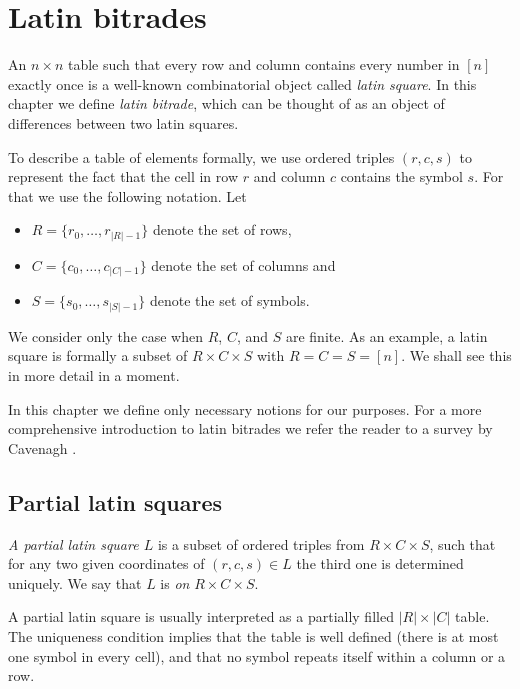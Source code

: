 \chapter{Latin bitrades}
\label{chap:bitrades}

An $n \times n$ table such that every row and column contains every number in $[n]$ exactly once is a well-known combinatorial object called \emph{latin square}. In this chapter we define \emph{latin bitrade}, which can be thought of as an object of differences between two latin squares.

To describe a table of elements formally, we use ordered triples $(r,c,s)$ to represent the fact that the cell in row $r$ and column $c$ contains the symbol $s$. For that we use the following notation. Let
\begin{itemize}
	\item $R = \{r_0,\dots,r_{|R|-1}\}$ denote the set of rows,
	\item $C = \{c_0,\dots,c_{|C|-1}\}$ denote the set of columns and
	\item $S = \{s_0,\dots,s_{|S|-1}\}$ denote the set of symbols.
\end{itemize}
We consider only the case when $R$, $C$, and $S$ are finite. As an example, a latin square is formally a subset of $R \times C \times S$ with $R = C = S = [n]$. We shall see this in more detail in a moment.

In this chapter we define only necessary notions for our purposes. For a more comprehensive introduction to latin bitrades we refer the reader to a survey by Cavenagh \cite{Cavenagh08}.

\section{Partial latin squares}

\begin{defn}
\emph{A partial latin square $L$} is a subset of ordered triples from $R \times C \times S$, such that for any two given coordinates of $(r,c,s)\in L$ the third one is determined uniquely. We say that $L$ is \emph{on} $R \times C \times S$.
\end{defn}

A partial latin square is usually interpreted as a partially filled $|R| \times |C|$ table. The uniqueness condition implies that the table is well defined (there is at most one symbol in every cell), and that no symbol repeats itself within a column or a row.

